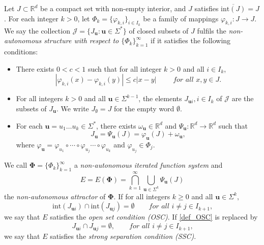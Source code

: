 \documentclass[12pt]{amsart}
\theoremstyle{plain}
\theoremstyle{definition}
\theoremstyle{remark}
\def\R{\mathbb{R}}
\newcommand{\bu}{\mathbf{u}}
\newcommand{\w}{\omega} %
\begin{document}
Let $J\subset\mathbb{R}^d$  be a compact set with non-empty interior, and $J$ satisfies $\overline{\mbox{int}(J)}=J$. For each integer $k>0$, let $\Phi_k=\{\varphi_{k, i} \}_{i\in I_k}$ be a family of mappings $\varphi_{k, i}:J\to J$. We say the collection $\mathcal{J}=\{J_{\mathbf{u}}:\mathbf{u}\in \Sigma^*\}$ of closed subsets of $J$ fulfils the \textit{non-autonomous structure with respect to $\{\Phi_k\}_{k=1}^\infty$} if it satisfies the following conditions:
\begin{itemize}
\item[(i).] There exists $0<c<1$ such that for all integer $k>0$ and all $i\in I_k$,
\begin{equation} \label{def_uccdn}
|\varphi_{k, i}(x)-\varphi_{k, i}(y)|\le  c|x-y| \qquad \textit{ for all }  x, y\in J.
\end{equation}
\item[(ii).] For all integers $k>0$ and all $\mathbf{u}\in \Sigma^{k-1}$, the elements $J_{\mathbf{u}i}, i\in I_k$ of $\mathcal{J}$ are the subsets of $J_{\mathbf{u}}$. We write $J_{\emptyset }=J$ for the empty word $\emptyset $.

\item[(iii).] For each $\mathbf{u}=u_1\ldots u_k \in \Sigma^*$,  there exists $\w_{\bu} \in \R^d$ and $\Psi_\mathbf{u}: \mathbb{R}^{d}\rightarrow \mathbb{R}^{d}$  such that
\begin{equation}\label{basic set}
    J_{\mathbf{u}}=\Psi_{\mathbf{u}}(J)=\varphi_\bu(J)+\omega_\bu,
   \end{equation}
    where $\varphi_\bu=\varphi_{u_1}\circ \cdots \circ \varphi_{u_j} \cdots \circ \varphi_{u_k}  $ and $\varphi_{u_j}\in \Phi_j$.
\end{itemize}
We call  $\boldsymbol{\Phi}=\{\Phi_k\}_{k=1}^\infty$   a \emph{non-autonomous iterated function system} and
\begin{equation}\label{att}
E=E(\boldsymbol{\Phi})=\bigcap_{k=1}^\infty \bigcup_{\mathbf{u}\in\Sigma^k}\Psi_{\mathbf{u}}(J)
\end{equation}
the \emph{non-autonomous attractor} of $\boldsymbol{\Phi}$. If for all integers $k\ge 0$ and all $\mathbf{u}\in\Sigma^{k},$  
\begin{equation}\label{def_OSC}
\mbox{int}(J_{\mathbf{u}i})\cap \mbox{int}(J_{\mathbf{u}j})=\emptyset \qquad \textit{for all $i\not= j\in I_{k+1}$,}
\end{equation}
 we say that $E$ satisfies the \emph{open set condition (OSC)}.
If \eqref{def_OSC} is replaced by 
$$
J_{\mathbf{u}i}\cap J_{\mathbf{u}j}=\emptyset, \qquad \textit{for all $i\not= j\in I_{k+1}$,}
$$
we say that $E$ satisfies the \emph{strong separation condition (SSC)}.
\end{document}
